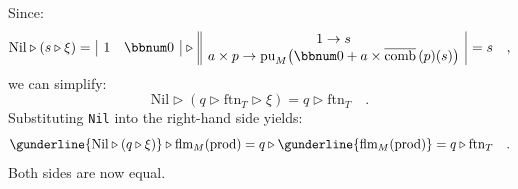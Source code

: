 Since:
\[
\text{Nil}\triangleright(s\triangleright\xi)=\,\begin{array}{|cc|}
1 & \bbnum 0\end{array}\,\triangleright\,\begin{array}{||c|}
1\rightarrow s\\
a\times p\rightarrow\text{pu}_{M}\big(\bbnum 0+a\times\overline{\text{comb}}\,(p)(s)\big)
\end{array}\,=s\quad,
\]
we can simplify:
\[
\text{Nil}\triangleright(q\triangleright\text{ftn}_{T}\triangleright\xi)=q\triangleright\text{ftn}_{T}\quad.
\]
Substituting \lstinline!Nil! into the right-hand side yields:
\[
\gunderline{\text{Nil}\triangleright(q\triangleright\xi)}\triangleright\text{flm}_{M}(\text{prod})=q\triangleright\gunderline{\text{flm}_{M}(\text{prod})}=q\triangleright\text{ftn}_{T}\quad.
\]
Both sides are now equal.

